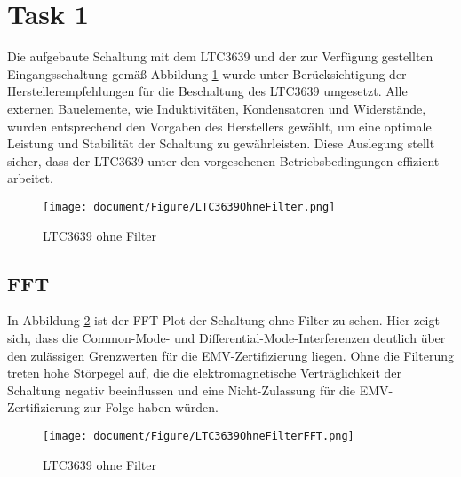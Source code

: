 \section{Task 1} \label{sec:Task1}

Die aufgebaute Schaltung mit dem LTC3639 und der zur Verfügung gestellten Eingangsschaltung gemäß Abbildung \ref{fig:LTC3639OhneFilter} wurde unter Berücksichtigung der Herstellerempfehlungen für die Beschaltung des LTC3639 umgesetzt. Alle externen Bauelemente, wie Induktivitäten, Kondensatoren und Widerstände, wurden entsprechend den Vorgaben des Herstellers gewählt, um eine optimale Leistung und Stabilität der Schaltung zu gewährleisten. Diese Auslegung stellt sicher, dass der LTC3639 unter den vorgesehenen Betriebsbedingungen effizient arbeitet.


\begin{figure}[H]
    \centering
    \texttt{[image: document/Figure/LTC3639OhneFilter.png]}
    \caption{LTC3639 ohne Filter}
    \label{fig:LTC3639OhneFilter}
\end{figure}

\subsection{FFT}

In Abbildung \ref{fig:LTC3639OhneFilterFFT} ist der FFT-Plot der Schaltung ohne Filter zu sehen. Hier zeigt sich, dass die Common-Mode- und Differential-Mode-Interferenzen deutlich über den zulässigen Grenzwerten für die EMV-Zertifizierung liegen. Ohne die Filterung treten hohe Störpegel auf, die die elektromagnetische Verträglichkeit der Schaltung negativ beeinflussen und eine Nicht-Zulassung für die EMV-Zertifizierung zur Folge haben würden.


\begin{figure}[H]
    \centering
    \texttt{[image: document/Figure/LTC3639OhneFilterFFT.png]}
    \caption{LTC3639 ohne Filter}
    \label{fig:LTC3639OhneFilterFFT}
\end{figure}


